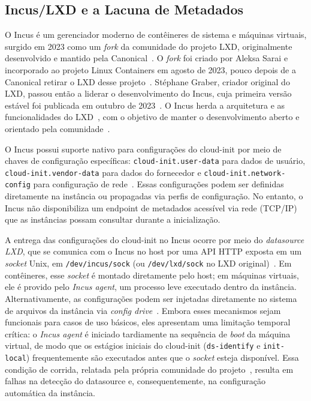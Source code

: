 \subsection{Incus/LXD e a Lacuna de Metadados}

O Incus é um gerenciador moderno de contêineres de sistema e máquinas virtuais, surgido em 2023 como um \textit{fork} da comunidade do projeto LXD, originalmente desenvolvido e mantido pela Canonical~\citep{incus_announcement, incus2024}. O \textit{fork} foi criado por Aleksa Sarai e incorporado ao projeto Linux Containers em agosto de 2023, pouco depois de a Canonical retirar o LXD desse projeto~\citep{incus_announcement}. Stéphane Graber, criador original do LXD, passou então a liderar o desenvolvimento do Incus, cuja primeira versão estável foi publicada em outubro de 2023~\citep{stgraber2023}. O Incus herda a arquitetura e as funcionalidades do LXD~\citep{lxd2024}, com o objetivo de manter o desenvolvimento aberto e orientado pela comunidade~\citep{incus_announcement}.

O Incus possui suporte nativo para configurações do cloud-init por meio de chaves de configuração específicas: \texttt{cloud-init.user-data} para dados de usuário, \texttt{cloud-init.vendor-data} para dados do fornecedor e \texttt{cloud-init.network-config} para configuração de rede~\citep{incus2024}. Essas configurações podem ser definidas diretamente na instância ou propagadas via perfis de configuração. No entanto, o Incus não disponibiliza um endpoint de metadados acessível via rede (TCP/IP) que as instâncias possam consultar durante a inicialização.

A entrega das configurações do cloud-init no Incus ocorre por meio do \textit{datasource LXD}, que se comunica com o Incus no host por uma API HTTP exposta em um \textit{socket} Unix, em \texttt{/dev/incus/sock} (ou \texttt{/dev/lxd/sock} no LXD original)~\citep{cloudinit_lxd_ds}. Em contêineres, esse \textit{socket} é montado diretamente pelo host; em máquinas virtuais, ele é provido pelo \textit{Incus agent}, um processo leve executado dentro da instância. Alternativamente, as configurações podem ser injetadas diretamente no sistema de arquivos da instância via \textit{config drive}~\citep{incus2024}. Embora esses mecanismos sejam funcionais para casos de uso básicos, eles apresentam uma limitação temporal crítica: o \textit{Incus agent} é iniciado tardiamente na sequência de \textit{boot} da máquina virtual, de modo que os estágios iniciais do cloud-init (\texttt{ds-identify} e \texttt{init-local}) frequentemente são executados antes que o \textit{socket} esteja disponível. Essa condição de corrida, relatada pela própria comunidade do projeto~\citep{incus_cloudinit_forum}, resulta em falhas na detecção do datasource e, consequentemente, na configuração automática da instância.

